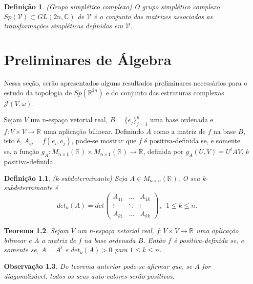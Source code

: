 \documentclass[12pt]{book}
\newtheorem{teorema}{Teorema}[section]
\newtheorem{definicao}[teorema]{Definição}
\newtheorem{observacao}[teorema]{Observação}
\newcommand{\complexificado}[1]{\mathcal{#1}}
\newcommand{\complexo}[1]{\mathbb{C}^{#1}}
\newcommand{\estruturascomplexas}[2]{\mathcal{J}(#1, #2)}
\newcommand{\generalgroup}[2]{GL(#1, #2)}
\newcommand{\generalgroupcomplexo}[1]{\generalgroup{#1}{\complexo{}}}
\newcommand{\gruposimpletico}[1]{Sp(#1)}
\newcommand{\matrizquadreal}[1]{M_{#1 \times #1}(\real{})}
\newcommand{\real}[1]{\mathbb{R}^{#1}}
\newcommand{\reta}{\real{}}
\begin{document}
	\begin{definicao}
		(Grupo simplético complexo) O grupo simplético complexo $\gruposimpletico{\complexificado{V}} \subset \generalgroupcomplexo{2n}$ de $\complexificado{V}$ é o conjunto das matrizes associadas as transformações simpléticas definidas em $\complexificado{V}$.
	\end{definicao}
	
	\chapter{Preliminares de Álgebra}
	
	Nessa seção, serão apresentados alguns resultados preliminares necessários para o estudo da topologia de $\gruposimpletico{\real{2n}}$ e do conjunto das estruturas complexas $\estruturascomplexas{V}{\omega}$.
	
	
	Sejam $V$ um n-espaço vetorial real, $B= \{e_{j}\}_{j=1}^{n}$ uma base ordenada e $f:V\times V\to \reta$ uma aplicação bilinear. Definindo $A$ como a matriz de $f$ na base $B$, isto é, $A_{ij} = f(e_{i}, e_{j})$, pode-se mostrar que $f$ é positiva-definida se, e somente se, a função $g_{A}: M_{n\times 1}(\reta)\times M_{n\times 1}(\reta) \to \reta$, definida por $
	g_{A}(U,V) = U^{t}AV$, é positiva-definida.
	
	\begin{definicao}
		(k-subdeterminante) Seja $A \in \matrizquadreal{n}$. O seu k-subdeterminante é
		$$
		det_{k}(A) =
		det \left(
		\begin{array}{ccc}
		A_{11} & \dots & A_{1k}
		\\
		\vdots & \ddots & \vdots
		\\
		A_{k1} & \dots & A_{kk}
		\end{array}
		\right),\;\; 1\leq k \leq n.
		$$
	\end{definicao}
	
	\begin{teorema}\label{teorema_matriz_positiva_definida}
		Sejam $V$ um n-espaço vetorial real, $f: V\times V\to \reta$ uma aplicação bilinear e $A$ a matriz de $f$ na base ordenada $B$. Então $f$ é positiva-definida se, e somente se, $A=A^{t}$ e $det_{k}(A)>0$ para $1\leq k\leq n$.
	\end{teorema}
	
	\begin{observacao}\label{observacao_matriz_positiva_definida}
		Do teorema anterior pode-se afirmar que, se $A$ for diagonalizável, todos os seus auto-valores serão positivos.
	\end{observacao}
	
\end{document}
